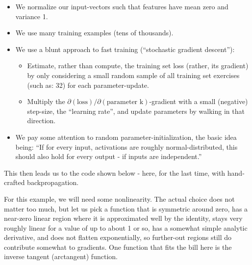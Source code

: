 \documentclass[11pt]{article}
\providecommand{\tightlist}{%
      \setlength{\itemsep}{0pt}\setlength{\parskip}{0pt}}
\begin{document}
\begin{itemize}
\tightlist
\item
  We normalize our input-vectors such that features have mean zero and
  variance 1.
\item
  We use many training examples (tens of thousands).
\item
  We use a blunt approach to fast training (``stochastic gradient
  descent''):

  \begin{itemize}
  \tightlist
  \item
    Estimate, rather than compute, the training set loss (rather, its
    gradient) by only considering a small random sample of all training
    set exercises (such as: 32) for each parameter-update.
  \item
    Multiply the
    \(\partial(\mbox{loss})/\partial(\mbox{parameter k})\)-gradient with
    a small (negative) step-size, the ``learning rate'', and update
    parameters by walking in that direction.
  \end{itemize}
\item
  We pay some attention to random parameter-initialization, the basic
  idea being: ``If for every input, activations are roughly
  normal-distributed, this should also hold for every output - if inputs
  are independent.''
\end{itemize}

This then leads us to the code shown below - here, for the last time,
with hand-crafted backpropagation.

For this example, we will need some nonlinearity. The actual choice does
not matter too much, but let us pick a function that is symmetric around
zero, has a near-zero linear region where it is approximated well by the
identity, stays very roughly linear for a value of up to about 1 or so,
has a somewhat simple analytic derivative, and does not flatten
exponentially, so further-out regions still do contribute somewhat to
gradients. One function that fits the bill here is the inverse tangent
(arctangent) function.
\end{document}
